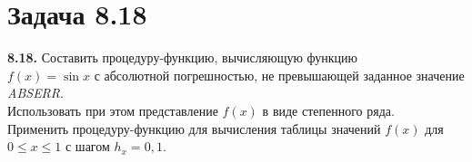 \documentclass[a4paper,12pt]{article}
\begin{document}
\section* {\large Задача 8.18}
\textbf{8.18.} Составить процедуру-функцию, вычисляющую функцию\\
$f(x)=\sin x$ с абсолютной погрешностью, не превышающей заданное
значение \textit{ABSERR}.\\
Использовать при этом представление $f(x)$ в виде степенного ряда.\\
Применить процедуру-функцию для вычисления таблицы значений $f(x)$ для
$0 \le x \le 1 $ с шагом $h_x=0,1$.
\end{document}
